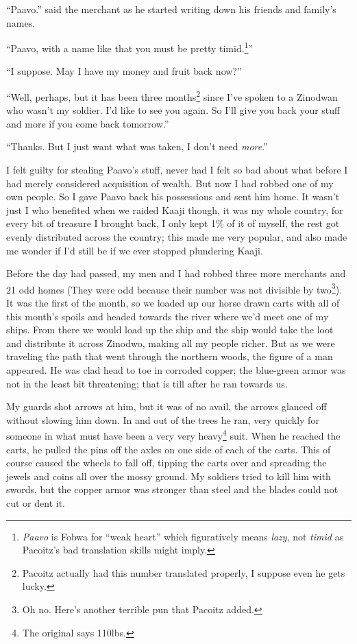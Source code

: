 ``Paavo.'' said the merchant as he started writing down his friends and family's names.

``Paavo, with a name like that you must be pretty timid.\footnote{\emph{Paavo} is Fo\-bwa for ``weak heart'' which figuratively means \emph{lazy}, not \emph{timid} as Pacoitz's bad translation skills might imply.}''

``I suppose. May I have my money and fruit back now?''

``Well, perhaps, but it has been three months\footnote{Pacoitz actually had this number translated properly, I suppose even he gets lucky.} since I've spoken to a Zinodwan who wasn't my soldier. I'd like to see you again. So I'll give you back your stuff and more if you come back tomorrow.''

``Thanks. But I just want what was taken, I don't need \emph{more}.''

I felt guilty for stealing Paavo's stuff, never had I felt so bad about what before I had merely considered acquisition of wealth. But now I had robbed one of my own people. So I gave Paavo back his possessions and sent him home. It wasn't just I who benefited when we raided Kaaji though, it was my whole country, for every bit of treasure I brought back, I only kept 1\% of it of myself, the rest got evenly distributed across the country; this made me very popular, and also made me wonder if I'd still be if we ever stopped plundering Kaaji.

Before the day had passed, my men and I had robbed three more merchants and 21 odd homes (They were odd because their number was not divisible by two\footnote{Oh no. Here's another terrible pun that Pacoitz added.}).
It was the first of the month, so we loaded up our horse drawn carts with all of this month's spoils and headed towards the river where we'd meet one of my ships. From there we would load up the ship and the ship would take the loot and distribute it across Zinodwo, making all my people richer.
But as we were traveling the path that went through the northern woods, the figure of a man appeared. He was clad head to toe in corroded copper; the blue-green armor was not in the least bit threatening; that is till after he ran towards us.

My guards shot arrows at him, but it was of no avail, the arrows glanced off without slowing him down. In and out of the trees he ran, very quickly for someone in what must have been a very very heavy\footnote{The original says 110lbs.} suit. When he reached the carts, he pulled the pins off the axles on one side of each of the carts. This of course caused the wheels to fall off, tipping the carts over and spreading the jewels and coins all over the mossy ground. My soldiers tried to kill him with swords, but the copper armor was stronger than steel and the blades could not cut or dent it. 

